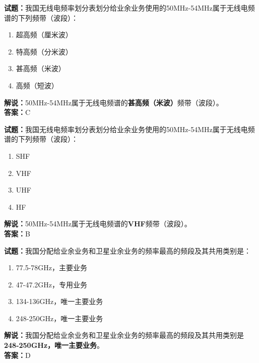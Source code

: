\documentclass{ctexbook}
\begin{document}
\bigskip




\noindent\textbf{试题：}我国无线电频率划分表划分给业余业务使用的50\unit{\MHz}-54\unit{\MHz}属于无线电频谱的下列频带（波段）：
\begin{enumerate}[leftmargin=3em]
\item 超高频（厘米波）
\item 特高频（分米波）
\item 甚高频（米波）
\item 高频（短波）
\end{enumerate}
\noindent\textbf{解说：}50\unit{\MHz}-54\unit{\MHz}属于无线电频谱的\textbf{甚高频（米波）}频带（波段）。\\\noindent\textbf{答案：}C

\bigskip




\noindent\textbf{试题：}我国无线电频率划分表划分给业余业务使用的50\unit{\MHz}-54\unit{\MHz}属于无线电频谱的下列频带（波段）：
\begin{enumerate}[leftmargin=3em]
\item SHF
\item VHF
\item UHF
\item HF
\end{enumerate}
\noindent\textbf{解说：}50\unit{\MHz}-54\unit{\MHz}属于无线电频谱的\textbf{VHF}频带（波段）。\\\noindent\textbf{答案：}B

\bigskip




\noindent\textbf{试题：}我国分配给业余业务和卫星业余业务的频率最高的频段及其共用类别是：
\begin{enumerate}[leftmargin=3em]
\item 77.5-78\unit{\GHz}，主要业务
\item 47-47.2\unit{\GHz}，专用业务
\item 134-136\unit{\GHz}，唯一主要业务
\item 248-250\unit{\GHz}，唯一主要业务
\end{enumerate}
\noindent\textbf{解说：}我国分配给业余业务和卫星业余业务的频率最高的频段及其共用类别是\textbf{248-250\unit{\GHz}，唯一主要业务}。\\\noindent\textbf{答案：}D

\bigskip
\end{document}
